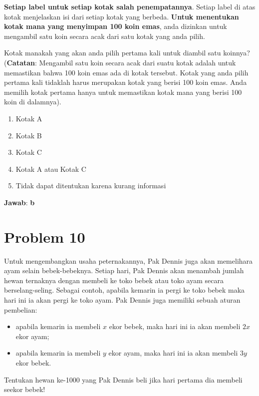 \documentclass{article}
\theoremstyle{plain}
\begin{document}
\noindent \textbf{Setiap label untuk setiap kotak salah penempatannya}. Setiap label di atas kotak menjelaskan isi dari setiap kotak yang berbeda. \textbf{Untuk menentukan kotak mana yang menyimpan 100 koin emas}, anda dizinkan untuk mengambil satu koin secara acak dari satu kotak yang anda pilih.

\bigskip
\noindent Kotak manakah yang akan anda pilih pertama kali untuk diambil satu koinnya? \\ 
(\textbf{Catatan}: Mengambil satu koin secara acak dari suatu kotak adalah untuk memastikan bahwa 100 koin emas ada di kotak tersebut. Kotak yang anda pilih pertama kali tidaklah harus merupakan kotak yang berisi 100 koin emas. Anda memilih kotak pertama hanya untuk memastikan kotak mana yang berisi 100 koin di dalamnya).

	\begin{enumerate}[-,topsep=0pt, nosep,label=\alph*. ]
		\item Kotak A
		\item Kotak B
		\item Kotak C
		\item Kotak A atau Kotak C
		\item Tidak dapat ditentukan karena kurang informasi
	\end{enumerate}

\bigskip
\noindent \textbf{Jawab}: \textbf{b}


\newpage
\section*{Problem 10}
Untuk mengembangkan usaha peternakannya, Pak Dennis juga akan memelihara ayam selain bebek-bebeknya. Setiap hari, Pak Dennis akan menambah jumlah hewan ternaknya dengan membeli ke toko bebek atau toko ayam secara berselang-seling. Sebagai contoh, apabila kemarin ia pergi ke toko bebek maka hari ini ia akan pergi ke toko ayam. Pak Dennis juga memiliki sebuah aturan pembelian:
	\begin{itemize}[-,topsep=0pt, nosep]
		\item apabila kemarin ia membeli $x$ ekor bebek, maka hari ini ia akan membeli $2x$ ekor ayam;
		\item apabila kemarin ia membeli $y$ ekor ayam, maka hari ini ia akan membeli $3y$ ekor bebek.
	\end{itemize}

\bigskip
\noindent Tentukan hewan ke-1000 yang Pak Dennis beli jika hari pertama dia membeli seekor bebek!
\end{document}
